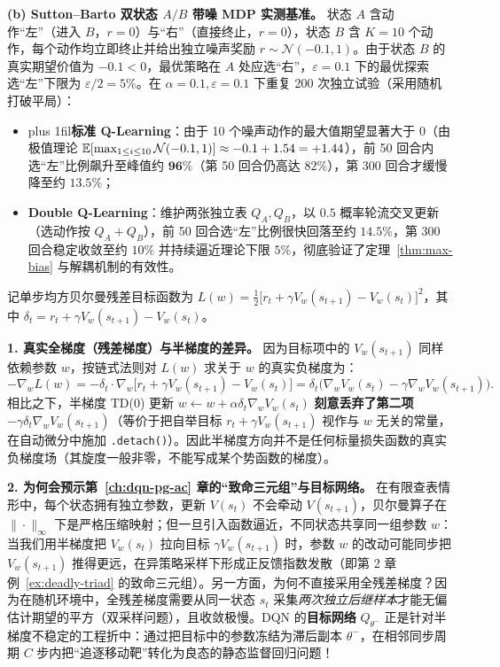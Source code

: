 \textbf{(b) Sutton--Barto 双状态 $A/B$ 带噪 MDP 实测基准。} 状态 $A$ 含动作“左”（进入 $B$，$r=0$）与“右”（直接终止，$r=0$），状态 $B$ 含 $K=10$ 个动作，每个动作均立即终止并给出独立噪声奖励 $r \sim \mathcal{N}(-0.1, 1)$。由于状态 $B$ 的真实期望价值为 $-0.1 < 0$，最优策略在 $A$ 处应选“右”，$\varepsilon = 0.1$ 下的最优探索选“左”下限为 $\varepsilon / 2 = 5\%$。在 $\alpha = 0.1, \varepsilon = 0.1$ 下重复 200 次独立试验（采用随机打破平局）：
\begin{itemize}
  \item {\rightskip=0pt plus 1fil\relax \textbf{标准 Q-Learning}：由于 10 个噪声动作的最大值期望显著大于 $0$（由极值理论 $\mathbb{E}[\max_{1 \le i \le 10} \mathcal{N}(-0.1, 1)] \approx -0.1 + 1.54 = +1.44$），前 50 回合内选“左”比例飙升至峰值约 $\mathbf{96\%}$（第 50 回合仍高达 $82\%$），第 300 回合才缓慢降至约 $13.5\%$；\par}
  \item \textbf{Double Q-Learning}：维护两张独立表 $Q_A, Q_B$，以 $0.5$ 概率轮流交叉更新（选动作按 $Q_A + Q_B$），前 50 回合选“左”比例很快回落至约 $\mathbf{14.5\%}$，第 300 回合稳定收敛至约 $10\%$ 并持续逼近理论下限 $5\%$，彻底验证了定理~\ref{thm:max-bias} 与解耦机制的有效性。
\end{itemize}


记单步均方贝尔曼残差目标函数为 $L(w) = \frac{1}{2}\big[r_t + \gamma V_w(s_{t+1}) - V_w(s_t)\big]^2$，其中 $\delta_t = r_t + \gamma V_w(s_{t+1}) - V_w(s_t)$。

\textbf{1. 真实全梯度（残差梯度）与半梯度的差异。} 因为目标项中的 $V_w(s_{t+1})$ 同样依赖参数 $w$，按链式法则对 $L(w)$ 求关于 $w$ 的真实负梯度为：
\[
  -\nabla_w L(w)
  = -\delta_t \cdot \nabla_w\!\big[r_t + \gamma V_w(s_{t+1}) - V_w(s_t)\big]
  = \delta_t \Big(\nabla_w V_w(s_t) - \gamma \nabla_w V_w(s_{t+1})\Big).
\]
相比之下，半梯度 TD(0) 更新 $w \leftarrow w + \alpha \delta_t \nabla_w V_w(s_t)$ \textbf{刻意丢弃了第二项 $-\gamma \delta_t \nabla_w V_w(s_{t+1})$}（等价于把自举目标 $r_t + \gamma V_w(s_{t+1})$ 视作与 $w$ 无关的常量，在自动微分中施加 \texttt{.detach()}）。因此半梯度方向并不是任何标量损失函数的真实负梯度场（其旋度一般非零，不能写成某个势函数的梯度）。

\textbf{2. 为何会预示第~\ref{ch:dqn-pg-ac} 章的“致命三元组”与目标网络。} 在有限查表情形中，每个状态拥有独立参数，更新 $V(s_t)$ 不会牵动 $V(s_{t+1})$，贝尔曼算子在 $\|\cdot\|_\infty$ 下是严格压缩映射；但一旦引入函数逼近，不同状态共享同一组参数 $w$：当我们用半梯度把 $V_w(s_t)$ 拉向目标 $\gamma V_w(s_{t+1})$ 时，参数 $w$ 的改动可能同步把 $V_w(s_{t+1})$ 推得更远，在异策略采样下形成正反馈指数发散（即第 2 章例~\ref{ex:deadly-triad} 的致命三元组）。另一方面，为何不直接采用全残差梯度？因为在随机环境中，全残差梯度需要从同一状态 $s_t$ 采集\emph{两次独立后继样本}才能无偏估计期望的平方（双采样问题），且收敛极慢。DQN 的\textbf{目标网络} $Q_{\theta^-}$ 正是针对半梯度不稳定的工程折中：通过把目标中的参数冻结为滞后副本 $\theta^-$，在相邻同步周期 $C$ 步内把“追逐移动靶”转化为良态的静态监督回归问题！

